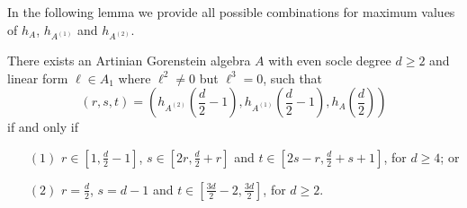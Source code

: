 \documentclass[12pt]{amsart}
\numberwithin{equation}{section}
\theoremstyle{plain} \newtheorem{theorem}{Theorem}[section]
\theoremstyle{definition} \newtheorem{definition}[theorem]{Definition}
\begin{document}
In the following lemma we  provide all possible combinations for maximum values of $h_A$, $h_{A^{(1)}}$ and $h_{A^{(2)}}$.
\begin{lemma}\label{maxvaluesevenLemma}
There exists an Artinian Gorenstein algebra $A$ with even socle degree $d\geq 2$ and linear form $\ell\in A_1$ where $\ell^2\neq 0$ but $\ell^3=0$, such that $$(r,s,t)=(h_{A^{(2)}}(\frac{d}{2}-1) ,h_{A^{(1)}}(\frac{d}{2}-1),h_A(\frac{d}{2}))$$ if and only if 
\begin{itemize}
\item [$(1)$]  $r\in [1,\frac{d}{2}-1]$, $s\in[2r,\frac{d}{2}+r]$ and $t\in[2s-r,\frac{d}{2}+s+1]$, for $d\geq 4$;  or
\item [$(2)$] $r=\frac{d}{2}$, $s=d-1$ and $t\in[\frac{3d}{2}-2,\frac{3d}{2}]$,  for $d\geq 2$.  
\end{itemize}
\end{lemma}
\end{document}
